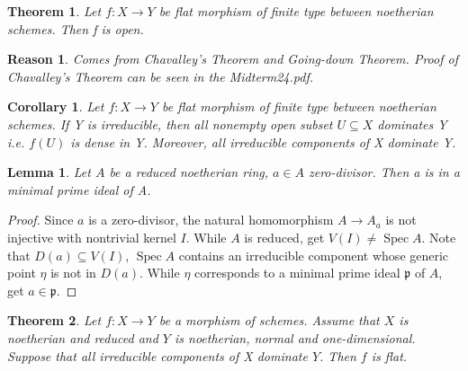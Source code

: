 \documentclass{ctexart}
\newtheorem{theorem}{Theorem}[section]
\newtheorem{lemma}{Lemma}[section]
\newtheorem{reason}{Reason}[section]
\newtheorem{corollary}{Corollary}[section]
\newcommand{\spec}{\operatorname{Spec}}
\begin{document}
\begin{theorem}
    Let $f: X \longrightarrow Y$ be flat morphism of finite type between noetherian schemes.
    Then f is open.
    \label{Theorem 5.5}
\end{theorem}
\begin{reason}
    Comes from Chavalley's Theorem and Going-down Theorem.
    Proof of Chavalley's Theorem can be seen in the Midterm24.pdf.
\end{reason}
\begin{corollary}
    Let $f: X \longrightarrow Y$ be flat morphism of finite type between noetherian schemes.
    If Y is irreducible, then all nonempty open subset $U \subseteq X$ dominates Y i.e. $f(U)$ is dense in Y.
    Moreover, all irreducible components of X dominate Y.
    \label{Corollary 5.3}
\end{corollary}
\begin{lemma}
    Let $A$ be a reduced noetherian ring, $a\in A$ zero-divisor.
    Then a is in a minimal prime ideal of A.
    \label{Lemma 5.3}
\end{lemma}
\begin{proof}
    Since $a$ is a zero-divisor, the natural homomorphism $A \longrightarrow A_{a}$ is not injective with nontrivial kernel $I$.
    While $A$ is reduced, get $V(I) \neq \spec A$.
    Note that $D(a) \subseteq V(I)$, $\spec A$ contains an irreducible component whose generic point $\eta$ is not in $D(a)$.
    While $\eta$ corresponds to a minimal prime ideal $\mathfrak{p}$ of $A$, get $a\in \mathfrak{p}$.
\end{proof}
\begin{theorem}
    Let $f: X \longrightarrow Y$ be a morphism of schemes.
    Assume that $X$ is noetherian and reduced and $Y$ is noetherian, normal and one-dimensional.
    Suppose that all irreducible components of X dominate $Y$.
    Then $f$ is flat.
    \label{Theorem 5.6}
\end{theorem}
\end{document}
